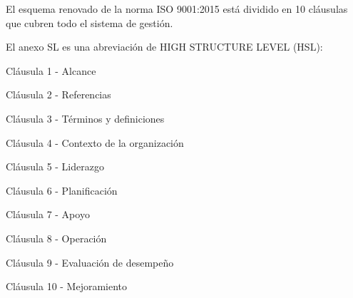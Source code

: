 \documentclass[10pt,a4paper]{article}
\begin{document}
El esquema renovado de la norma ISO 9001:2015 está dividido en 10 cláusulas que cubren todo el sistema de gestión.

El anexo SL es una abreviación de HIGH STRUCTURE LEVEL (HSL):

Cláusula 1 - Alcance

Cláusula 2 - Referencias

Cláusula 3 - Términos y definiciones

Cláusula 4 - Contexto de la organización

Cláusula 5 - Liderazgo

Cláusula 6 - Planificación

Cláusula 7 - Apoyo

Cláusula 8 - Operación

Cláusula 9 - Evaluación de desempeño

Cláusula 10 - Mejoramiento
\end{document}
